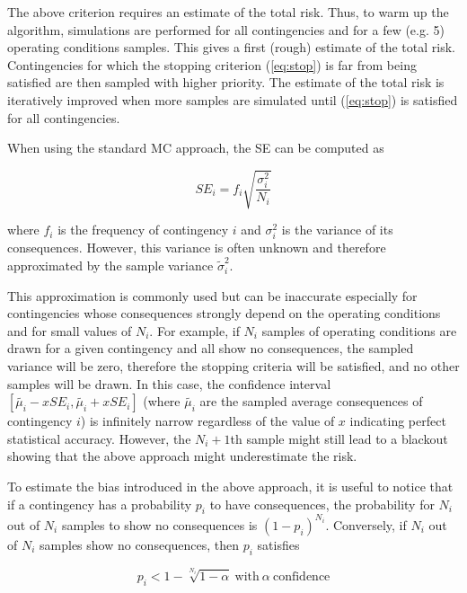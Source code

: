 The above criterion requires an estimate of the total risk. Thus, to warm up the algorithm, simulations are performed for all contingencies and for a few (e.g. 5) operating conditions samples. This gives a first (rough) estimate of the total risk. Contingencies for which the stopping criterion (\ref{eq:stop}) is far from being satisfied are then sampled with higher priority. The estimate of the total risk is iteratively improved when more samples are simulated until (\ref{eq:stop}) is satisfied for all contingencies.

When using the standard MC approach, the SE can be computed as

\begin{equation}
  \label{eq:SE_classic}
  SE_i = f_i \sqrt{\frac{\sigma_i^2}{N_i}}
\end{equation}

\noindent where \(f_i\) is the frequency of contingency \(i\) and \(\sigma_i^2\) is the variance of its consequences. However, this variance is often unknown and therefore approximated by the sample variance \(\tilde{\sigma}_i^2\).

This approximation is commonly used but can be inaccurate especially for contingencies whose consequences strongly depend on the operating conditions and for small values of \(N_i\). For example, if \(N_i\) samples of operating conditions are drawn for a given contingency and all show no consequences, the sampled variance will be zero, therefore the stopping criteria will be satisfied, and no other samples will be drawn. In this case, the confidence interval \([\tilde{\mu_i} - x SE_i, \tilde{\mu_i} + x SE_i]\) (where \(\tilde{\mu_i}\) are the sampled average consequences of contingency \(i\)) is infinitely narrow regardless of the value of \(x\) indicating perfect statistical accuracy. However, the \(N_i+1\)th sample might still lead to a blackout showing that the above approach might underestimate the risk.

To estimate the bias introduced in the above approach, it is useful to notice that if a contingency has a probability \(p_i\) to have consequences, the probability for \(N_i\) out of \(N_i\) samples to show no consequences is \((1-p_i)^{N_i}\). Conversely, if \(N_i\) out of \(N_i\) samples show no consequences, then \(p_i\) satisfies

\begin{equation} \label{eq:proba}
  p_i < 1 - \sqrt[N_i]{1-\alpha} \ \text{with}\ \alpha \ \text{confidence}
\end{equation}

